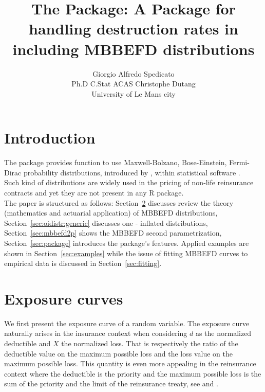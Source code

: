 \documentclass[article, nojss]{jss}
\author{Giorgio Alfredo Spedicato\\ Ph.D C.Stat ACAS \And Christophe Dutang\\ University of Le Mans city}
\title{The \pkg{mbbefd} Package: A Package for handling destruction rates in \proglang{R} including
MBBEFD distributions}
\begin{document}




\maketitle



\section{Introduction}

The  package provides function to use Maxwell-Bolzano, Bose-Einstein, Fermi-Dirac probability distributions, introduced by \cite{bernegger97}, within  statistical software \citep{rSoftware}.\\ Such kind of distributions are widely used in the pricing of non-life reinsurance contracts and yet they are not present in any R package.\\

The paper is structured as follows: Section~\ref{sec:generalities} discusses review the theory (mathematics and actuarial application) of MBBEFD distributions, Section~\ref{sec:oidistr:generic} discusses one - inflated distributions, Section~\ref{sec:mbbefd2p} shows the MBBEFD second parametrization, Section~\ref{sec:package} introduces the package's features. Applied examples are shown in Section~\ref{sec:examples} while the issue of fitting MBBEFD curves to empirical data is discussed in Section~\ref{sec:fitting}.\\



\section{Exposure curves}\label{sec:generalities}
We first present the exposure curve of a random variable.
The exposure curve naturally arises in the insurance context when considering $d$ as the normalized 
deductible and $X$ the normalized loss. 
That is respectively the ratio of the deductible value on the maximum possible loss
and the loss value on the maximum possible loss.
This quantity is even more appealing in the reinsurance context where the deductible is
the priority and the maximum possible loss is the sum of the priority and
the limit of the reinsurance treaty, see \cite{bernegger97} and \cite{mahler}.
\end{document}
